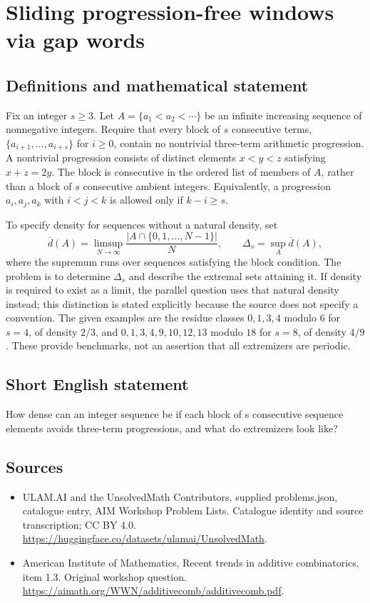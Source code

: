\documentclass[11pt,a4paper]{article}
\begin{document}
\section*{Sliding progression-free windows via gap words}\label{statement}

\subsection{Definitions and mathematical statement}
Fix an integer $s\ge3$. Let $A=\{a_1<a_2<\cdots\}$ be an infinite
increasing sequence of nonnegative integers. Require that every block
of $s$ consecutive terms, $\{a_{i+1},\ldots,a_{i+s}\}$ for $i\ge0$,
contain no nontrivial three-term arithmetic progression.
A nontrivial progression consists of distinct elements $x<y<z$
satisfying $x+z=2y$. The block is consecutive in the ordered list of
members of $A$, rather than a block of $s$ consecutive ambient integers.
Equivalently, a progression $a_i,a_j,a_k$ with $i<j<k$ is allowed
only if $k-i\ge s$.

To specify density for sequences without a natural density, set
\[
 \overline d(A)=\limsup_{N\to\infty}
                \frac{|A\cap\{0,1,\ldots,N-1\}|}{N},\qquad
 \Delta_s=\sup_A\overline d(A),
\]
where the supremum runs over sequences satisfying the block condition.
The problem is to determine $\Delta_s$ and describe the extremal sets
attaining it. If density is required to exist as a limit, the parallel
question uses that natural density instead; this distinction is stated
explicitly because the source does not specify a convention.
The given examples are the residue classes $0,1,3,4$ modulo $6$ for
$s=4$, of density $2/3$, and $0,1,3,4,9,10,12,13$ modulo $18$ for
$s=8$, of density $4/9$. These provide benchmarks, not an assertion
that all extremizers are periodic.
\subsection{Short English statement}
How dense can an integer sequence be if each block of s consecutive sequence elements avoids three-term progressions, and what do extremizers look like?
\subsection{Sources}
\begin{itemize}
\item[S1] ULAM.AI and the UnsolvedMath Contributors, supplied problems.json, catalogue entry, AIM Workshop Problem Lists. Catalogue identity and source transcription; CC BY 4.0.
\url{https://huggingface.co/datasets/ulamai/UnsolvedMath}.
\item[S2] American Institute of Mathematics, Recent trends in additive combinatorics, item 1.3. Original workshop question.
\url{https://aimath.org/WWN/additivecomb/additivecomb.pdf}.
\end{itemize}
\end{document}
